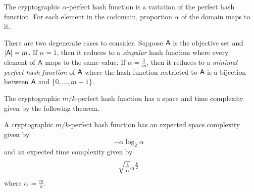 \documentclass[ ../main.tex]{subfiles}
\begin{document}
\begin{definition}
    The cryptographic $\alpha$-perfect hash function is a variation of the perfect hash function.
    For each element in the codomain, proportion $\alpha$ of the domain maps to it.
\end{definition}

There are two degenerate cases to consider.
Suppose $\Set{A}$ is the objective set and $\Card{\Set{A}}=m$.
If $\alpha=1$, then it reduces to a \emph{singular} hash function where every element of $\Set{A}$ maps to the same value.
If $\alpha=\frac{1}{m}$, then it reduces to a \emph{minimal perfect hash function} of $\Set{A}$ where the hash function restricted to $\Set{A}$ is a bijection between $\Set{A}$ and $\{0,\ldots,m-1\}$.




The cryptographic $m/k$-perfect hash function has a space and time complexity given by the following theorem.
\begin{theorem}
    A cryptographic $m/k$-perfect hash function has an expected space complexity given by
    \begin{equation}
        -\alpha \log_2 \alpha
    \end{equation}
    and an expected time complexity given by
    \begin{equation}
        \mathsmaller{\sqrt{\frac{k}{\alpha}}} \alpha^{\frac{k}{2}}
    \end{equation}
    where $\alpha \coloneqq \frac{m}{k}$.
\end{theorem}
\end{document}
